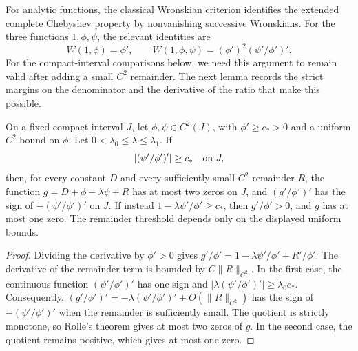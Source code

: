 For analytic functions, the classical Wronskian criterion
\cite[Lemma~2.3(b)]{GMV2011} identifies the extended complete
Chebyshev property by nonvanishing successive Wronskians.
For the three functions \(1,\phi,\psi\), the relevant identities are
\[
 W(1,\phi)=\phi',\qquad
 W(1,\phi,\psi)=(\phi')^2(\psi'/\phi')'.
\]
For the compact-interval comparisons below, we need this argument to
remain valid after adding a small \(C^2\) remainder. The next lemma
records the strict margins on the denominator and the derivative
of the ratio that make this possible.

\begin{lemma}
\label{lem:direct-derivative-ratio-count}
On a fixed compact interval \(J\), let \(\phi,\psi\in C^2(J)\),
with \(\phi'\ge c_*>0\) and a uniform \(C^2\) bound on \(\phi\).
Let \(0<\lambda_0\le\lambda\le\lambda_1\). If
\[
 |(\psi'/\phi')'|\ge c_*
 \quad\hbox{on }J,
\]
then, for every constant \(D\) and every sufficiently small
\(C^2\) remainder \(R\), the function
\(g=D+\phi-\lambda\psi+R\) has at most two zeros on \(J\), and
\((g'/\phi')'\) has the sign of \(-(\psi'/\phi')'\) on \(J\).
If instead \(1-\lambda\psi'/\phi'\ge c_*\), then \(g'/\phi'>0\), and
\(g\) has at most one zero.
The remainder threshold depends only on the displayed uniform bounds.
\end{lemma}

\begin{proof}
Dividing the derivative by \(\phi'>0\) gives
\(g'/\phi'=1-\lambda\psi'/\phi'+R'/\phi'\).
The derivative of the remainder term is bounded by
\(C\|R\|_{C^2}\). In the first case, the continuous function
\((\psi'/\phi')'\) has one sign and
\(|\lambda(\psi'/\phi')'|\ge\lambda_0c_*\). Consequently,
\((g'/\phi')'=-\lambda(\psi'/\phi')'+O(\|R\|_{C^2})\) has the sign of
\(-(\psi'/\phi')'\) when the remainder is sufficiently small.
The quotient is strictly monotone, so Rolle's theorem gives at most
two zeros of \(g\). In the second case, the quotient remains positive,
which gives at most one zero.
\end{proof}

